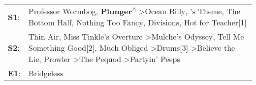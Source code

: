 \begin{supertabular}{p{0.03\textwidth}p{0.92\textwidth}}
 \textbf{S1}:  &                                                                                                                            Professor Wormbog\textsuperscript{}, \enspace \textbf{Plunger\textsuperscript{$\wedge$}} \textgreater \enspace Ocean Billy\textsuperscript{}, 's Theme\textsuperscript{}, \enspace The Bottom Half\textsuperscript{}, \enspace Nothing Too Fancy\textsuperscript{}, \enspace Divisions\textsuperscript{}, \enspace Hot for Teacher[1]\textsuperscript{}  \enspace  \\
 \textbf{S2}:  &  Thin Air\textsuperscript{}, \enspace Miss Tinkle's Overture\textsuperscript{} \textgreater \enspace Mulche's Odyssey\textsuperscript{}, \enspace Tell Me Something Good[2]\textsuperscript{}, \enspace Much Obliged\textsuperscript{} \textgreater \enspace Drums[3]\textsuperscript{} \textgreater \enspace Believe the Lie\textsuperscript{}, \enspace Prowler\textsuperscript{} \textgreater \enspace The Pequod\textsuperscript{} \textgreater \enspace Partyin' Peeps\textsuperscript{}  \enspace  \\
 \textbf{E1}:  &                                                                                                                                                                                                                                                                                                                                                                                                                                                                  Bridgeless\textsuperscript{}  \enspace  \\
\end{supertabular}
